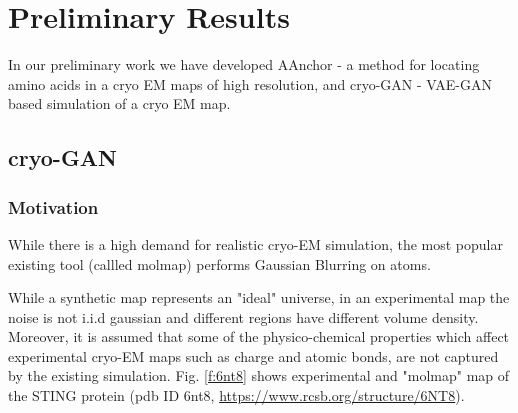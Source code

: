 \section{Preliminary Results}
In our preliminary work we have developed AAnchor - a method for locating amino acids in a cryo EM maps of high resolution, and cryo-GAN  - VAE-GAN based simulation of a cryo EM map.
\subsection{cryo-GAN}\label{s:c-GAN}
\subsubsection{Motivation}
While there is a high demand for realistic cryo-EM simulation, the most popular  existing tool (callled  molmap) performs Gaussian Blurring on atoms.

While a synthetic map represents  an "ideal" universe, in an experimental map the noise is not i.i.d gaussian and different regions have different volume density. 
Moreover, it is assumed that some of the physico-chemical properties which affect experimental cryo-EM maps such as charge and atomic bonds, are not captured by the existing simulation. 
Fig. \ref{f:6nt8} shows experimental and "molmap" map of the STING protein (pdb ID 6nt8, \url{https://www.rcsb.org/structure/6NT8}).

